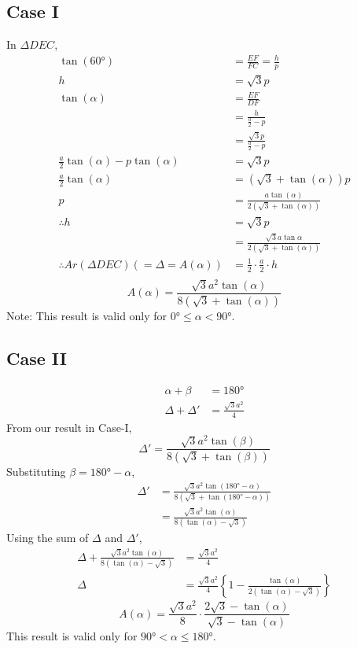 \documentclass{article}
\begin{document}
\subsection*{Case I}
In $\Delta DEC$,
\begin{align*}
    \tan(\ang{60})&=\frac{EF}{FC}=\frac{h}{p} \\
    h&=\sqrt{3}p \\
    \tan(\alpha)&=\frac{EF}{DF} \\
                &=\frac{h}{\frac{a}{2}-p} \\
                &=\frac{\sqrt{3}p}{\frac{a}{2}-p} \\
    \frac{a}{2}\tan(\alpha)-p\tan(\alpha)&=\sqrt{3}p \\
    \frac{a}{2}\tan(\alpha)&=(\sqrt{3}+\tan(\alpha))p \\
    p&=\frac{a \tan(\alpha)}{2(\sqrt{3}+\tan(\alpha))} \\
    \therefore h&= \sqrt{3}p \\
                &= \frac{\sqrt{3}a \tan{\alpha}}{2(\sqrt{3}+\tan(\alpha))} \\
    \therefore Ar(\Delta DEC) (=\Delta = A(\alpha)) &= \frac{1}{2} \cdot \frac{a}{2} \cdot h \\
\end{align*}
$$\boxed{A(\alpha)=\frac{\sqrt{3} a^{2} \tan(\alpha)}{8 (\sqrt{3}+\tan(\alpha))}}$$
Note: This result is valid only for $\ang{0} \leq \alpha < \ang{90}$.
\subsection*{Case II}
\begin{align*}
    \alpha + \beta &= \ang{180} \\
    \Delta + \Delta' &= \frac{\sqrt{3}a^{2}}{4}
\end{align*}
From our result in Case-I,
\[\Delta' = \frac{\sqrt{3} a^2 \tan(\beta)}{8(\sqrt{3}+\tan(\beta))}\]
Substituting $\beta = \ang{180} - \alpha$,
\begin{align*}
    \Delta' &= \frac{\sqrt{3}a^{2}\tan(\ang{180}-\alpha)}{8(\sqrt{3}+\tan(\ang{180}-\alpha))} \\
            &= \frac{\sqrt{3}a^{2}\tan(\alpha)}{8(\tan(\alpha)-\sqrt{3})}
\end{align*}
Using the sum of $\Delta$ and $\Delta'$,
\begin{align*}
    \Delta + \frac{\sqrt{3}a^{2}\tan(\alpha)}{8(\tan(\alpha)-\sqrt{3})} &= \frac{\sqrt{3}a^{2}}{4} \\
    \Delta &= \frac{\sqrt{3}a^2}{4}\left\{1-\frac{\tan(\alpha)}{2(\tan(\alpha)-\sqrt{3})}\right\}
\end{align*}
\[\boxed{A(\alpha)=\frac{\sqrt{3}a^2}{8}\cdot \frac{2\sqrt{3}-\tan(\alpha)}{\sqrt{3}-\tan(\alpha)}}\]
This result is valid only for $\ang{90} < \alpha \leq \ang{180}$.
\medskip
\end{document}
